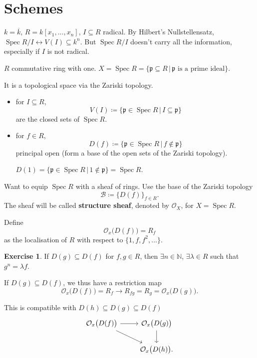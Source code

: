 \documentclass[12pt]{article}
\DeclareMathOperator{\Spec}{Spec}
\theoremstyle{definition}
\newtheorem*{exercise}{Exercise}
\theoremstyle{remark}
\begin{document}
\section{Schemes}
$k=\overline{k}$, $R=k[x_1,\ldots,x_n]$, $I\subseteq R$ radical. By Hilbert's Nullstellensatz, $\Spec R/I\leftrightarrow V(I)\subseteq k^n$. But $\Spec R/I$ doesn't carry all the information, especially if $I$ is not radical.

$R$ commutative ring with one. $X=\Spec R=\{\mathfrak{p}\subseteq R\,|\,\mathfrak{p}\text{ is a prime ideal}\}$.

It is a topological space via the Zariski topology.

\begin{itemize}
\item for $I\subseteq R$,
\[V(I)\coloneqq\{\mathfrak{p}\in\Spec R\,|\,I\subseteq\mathfrak{p}\}\]
are the closed sets of $\Spec R$.

\item for $f\in R$,
\[D(f)\coloneqq\{\mathfrak{p}\in\Spec R\,|\,f\notin\mathfrak{p}\}\]
principal open (form a base of the open sets of the Zariski topology).

$D(1)=\{\mathfrak{p}\in\Spec R\,|\,1\notin\mathfrak{p}\}=\Spec R$.
\end{itemize}

Want to equip $\Spec R$ with a sheaf of rings. Use the base of the Zariski topology
\[\mathcal{B}\coloneqq\big\{D(f)\big\}_{f\in R}.\]
The sheaf will be called \textbf{structure sheaf}, denoted by $\mathcal{O}_X$, for $X=\Spec R$.

Define
\[\mathcal{O}_x\big(D(f)\big)=R_f\]
as the localisation of $R$ with respect to $\{1,f,f^2,\ldots\}$.

\begin{exercise}
If $D(g)\subseteq D(f)$ for $f,g\in R$, then $\exists n\in\mathbb{N}$, $\exists\lambda\in R$ such that $g^n=\lambda f$.
\end{exercise}

If $D(g)\subseteq D(f)$, we thus have a restriction map
\[\mathcal{O}_x\big(D(f)\big)=R_f\longrightarrow R_{fg}=R_g=\mathcal{O}_x\big(D(g)\big).\]

This is compatible with $D(h)\subseteq D(g)\subseteq D(f)$
\[
\begin{tikzcd}
\mathcal{O}_x\big(D(f)\big)\arrow[r]\arrow[rd]&\mathcal{O}_x\big(D(g)\big)\arrow[d]\\
&\mathcal{O}_x\big(D(h)\big).
\end{tikzcd}
\]
\end{document}
